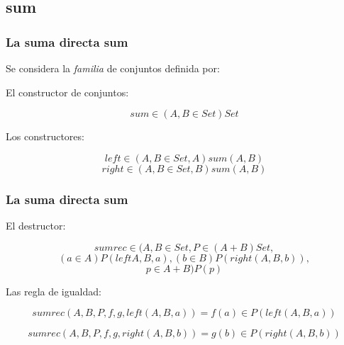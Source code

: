\documentclass{beamer}
\begin{document}
\subsection{sum}


\begin{frame}\frametitle{La suma directa sum}
  Se considera la \emph{familia} de conjuntos definida por:

  \pause

  El constructor de conjuntos:
  
  $$sum \in (A, B \in Set)Set$$
    
  \pause

  Los constructores:

  $$left \in (A,B \in Set, A)sum(A,B) $$
  $$right \in (A,B \in Set,B)sum(A,B) $$
\end{frame}

\begin{frame}\frametitle{La suma directa sum}
  \pause

  El destructor:

  
  $$sumrec \in (A,B\in Set, P\in (A+B)Set,$$
  $$ (a\in A)P(left A,B,a),(b\in B)P(right(A,B,b)),$$
  $$p\in A+B) P(p)$$
    
  \pause

 Las regla de igualdad:

 $$sumrec(A,B,P,f,g,left(A,B,a)) = f(a) \in P(left(A,B,a))$$

 $$sumrec(A,B,P,f,g,right(A,B,b)) = g(b) \in P(right(A,B,b))$$
 
 \pause
 
\end{frame}
\end{document}
